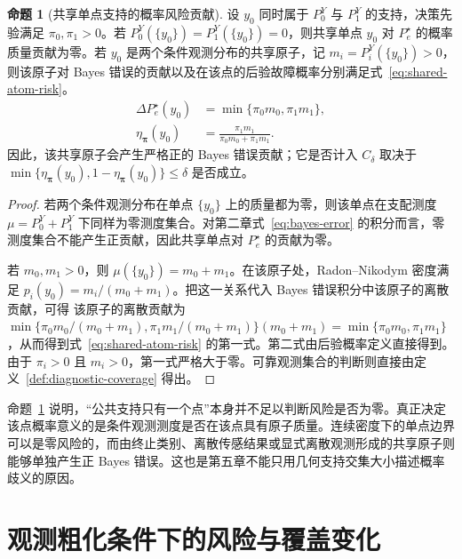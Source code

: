 \documentclass[master,fontset=ubuntu]{shnuthesis}
\theoremstyle{definition}
\newtheorem{thesisproposition}{命题}
\begin{document}
\begin{thesisproposition}[共享单点支持的概率风险贡献]
\label{prop:shared-point-risk}
设 \(y_0\) 同时属于 \(P_0^Y\) 与 \(P_1^Y\) 的支持，决策先验满足 \(\pi_0,\pi_1>0\)。若
\(P_0^Y(\{y_0\})=P_1^Y(\{y_0\})=0\)，则共享单点 \(y_0\) 对 \(P_e^\star\) 的概率质量贡献为零。若 \(y_0\) 是两个条件观测分布的共享原子，记
\(m_i=P_i^Y(\{y_0\})>0\)，则该原子对 Bayes 错误的贡献以及在该点的后验故障概率分别满足式~\eqref{eq:shared-atom-risk}。
\begin{equation}
\begin{aligned}
\Delta P_e^\star(y_0)
&=
\min\{\pi_0m_0,\pi_1m_1\},\\
\eta_{\boldsymbol\pi}(y_0)
&=
\frac{\pi_1m_1}
{\pi_0m_0+\pi_1m_1}.
\end{aligned}
\label{eq:shared-atom-risk}
\end{equation}
因此，该共享原子会产生严格正的 Bayes 错误贡献；它是否计入 \(C_\delta\) 取决于
\(\min\{\eta_{\boldsymbol\pi}(y_0),1-\eta_{\boldsymbol\pi}(y_0)\}\leq\delta\) 是否成立。
\end{thesisproposition}

\begin{proof}
若两个条件观测分布在单点 \(\{y_0\}\) 上的质量都为零，则该单点在支配测度 \(\mu=P_0^Y+P_1^Y\) 下同样为零测度集合。对第二章式~\eqref{eq:bayes-error} 的积分而言，零测度集合不能产生正贡献，因此共享单点对 \(P_e^\star\) 的贡献为零。

若 \(m_0,m_1>0\)，则 \(\mu(\{y_0\})=m_0+m_1\)。在该原子处，Radon--Nikodym 密度满足
\(p_i(y_0)=m_i/(m_0+m_1)\)。把这一关系代入 Bayes 错误积分中该原子的离散贡献，可得
该原子的离散贡献为
\(\min\{\pi_0m_0/(m_0+m_1),\pi_1m_1/(m_0+m_1)\}(m_0+m_1)
=\min\{\pi_0m_0,\pi_1m_1\}\)，从而得到式~\eqref{eq:shared-atom-risk} 的第一式。第二式由后验概率定义直接得到。由于 \(\pi_i>0\) 且 \(m_i>0\)，第一式严格大于零。可靠观测集合的判断则直接由定义~\ref{def:diagnostic-coverage} 得出。
\end{proof}

命题~\ref{prop:shared-point-risk} 说明，“公共支持只有一个点”本身并不足以判断风险是否为零。真正决定该点概率意义的是条件观测测度是否在该点具有原子质量。连续密度下的单点边界可以是零风险的，而由终止类别、离散传感结果或显式离散观测形成的共享原子则能够单独产生正 Bayes 错误。这也是第五章不能只用几何支持交集大小描述概率歧义的原因。

\section{观测粗化条件下的风险与覆盖变化}
\end{document}

